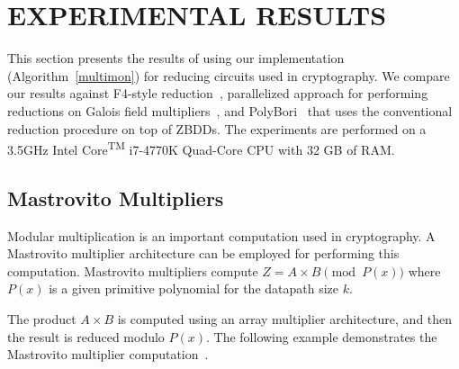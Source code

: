 \section{EXPERIMENTAL RESULTS}
\label{sec:exp}


This section presents the results of using our implementation (Algorithm~\ref{multimon}) for reducing
circuits used in cryptography. We compare our results against F4-style reduction~\cite{pruss:tcad}, 
parallelized approach for performing reductions on Galois field multipliers~\cite{cunxi:aspdac17}, 
and PolyBori~\cite{polybori:2009} that uses the conventional reduction procedure on top of ZBDDs. 
The experiments are performed on a 3.5GHz Intel 
Core\textsuperscript{TM} i7-4770K Quad-Core CPU with 32 GB of RAM. 

\subsection{Mastrovito Multipliers}

Modular multiplication is an important computation used in cryptography. 
A Mastrovito multiplier architecture can be employed for performing this computation.
Mastrovito multipliers compute $Z = A\times B \pmod{
  P(x)}$ where $P(x)$ is a given primitive polynomial for the datapath size
$k$. 

The product $A \times B$ is computed using an array multiplier architecture, and then the result is reduced modulo $P(x)$.
The following example demonstrates the Mastrovito multiplier computation~\cite{lv:tcad2013}.


